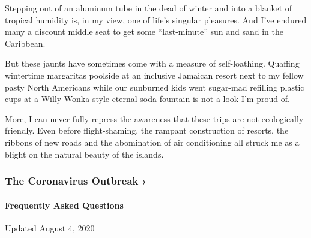 Stepping out of an aluminum tube in the dead of winter and into a
blanket of tropical humidity is, in my view, one of life's singular
pleasures. And I've endured many a discount middle seat to get some
``last-minute'' sun and sand in the Caribbean.

But these jaunts have sometimes come with a measure of self-loathing.
Quaffing wintertime margaritas poolside at an inclusive Jamaican resort
next to my fellow pasty North Americans while our sunburned kids went
sugar-mad refilling plastic cups at a Willy Wonka-style eternal soda
fountain is not a look I'm proud of.

More, I can never fully repress the awareness that these trips are not
ecologically friendly. Even before flight-shaming, the rampant
construction of resorts, the ribbons of new roads and the abomination of
air conditioning all struck me as a blight on the natural beauty of the
islands.

\href{https://www.nytimes.com/news-event/coronavirus?action=click\&pgtype=Article\&state=default\&region=MAIN_CONTENT_3\&context=storylines_faq}{}

\hypertarget{the-coronavirus-outbreak-}{%
\subsubsection{The Coronavirus Outbreak
›}\label{the-coronavirus-outbreak-}}

\hypertarget{frequently-asked-questions}{%
\paragraph{Frequently Asked
Questions}\label{frequently-asked-questions}}

Updated August 4, 2020

